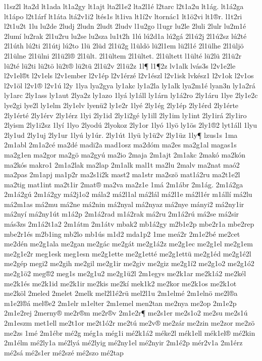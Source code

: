 {l1sz2l
lta2d
lt1ada
lt1a2gy
lt1ajt
lta2l1e2
lta2l1é
l2tarc
l2t1a2u
lt1ág.
lt1á2ga
lt1ápo
l2t1árf
lt1áta
ltá2v1i2
ltés1s
lt1iva
lt1í2v
ltornác1
lt1ö2vi
lt1®r.
l1t2ri
l2t1u2t
1lu
lu2de
2ludj
2ludn
2ludt
2ludv
l1u2go
l1ugr
lu2le
2luli
2lulr
lu2m1é
2lumí
lu2rak
2l1u2ru
lu2se
lu2sza
lu1t2h
1lú
lú2d1a
lú2gá
2l1ú2j
2l1ú2sz
lú2té
2l1úth
lú2ti
2l1útj
lú2to
1lü
2lüd
2l1ü2g
l1üldö
lü2l1em
lü2l1é
2l1ülhe
2l1üljö
2l1ülne
2l1ülni
2l1ü2l®
2l1ült.
2l1ültem
2l1ültet.
2l1ültett
l1ülté
lü2lü
2l1ü2r
lü2té
lü2ti
lü2tö
lü2t®
lü2tü
2l1ü2v
2l1ü2z
1l¶
l1¶2z
lv1alk
lvás3s
l2v1e2le
l2v1el®t
l2v1els
l2v1ember
l2v1ép
l2v1érzé
l2v1észl
l2v1isk
lvkész1
l2v1ok
l2v1os
l2v1öl
l2v1®
l2v1ú
l2y
1lya
lya2gya
ly1akc
ly1a2la
ly1alk
lya2m1é
lyan3n
ly1a2rá
ly1arc
2ly1ass
ly1aut
2lya2z
ly1azo
1lyá
ly1áll
ly1árn
ly1á2ro
2ly1áru
1lye
2ly1e2c
lye2gi
lye2l
ly1elm
2ly1elv
lyenü2
ly1e2r
1lyé
2ly1ég
2ly1ép
2ly1érd
2ly1érte
2ly1érté
2ly1érv
2ly1érz
1lyi
2ly1id
2ly1i2gé
ly1ill
2ly1im
ly1int
2ly1irá
2ly1iro
2lyism
2ly1i2sz
1lyí
1lyo
2lyodú
2lyokoz
2ly1or
1lyó
1lyö
ly1ös
2ly1®2
lyt1áll
1lyu
2ly1ud
2ly1uj
2ly1ur
1lyú
ly1úr.
2ly1út
1lyü
ly1ü2v
2ly1üz
1ly¶
lzus1s
1ma
2m1abl
2m1a2cé
ma2dé
madi2a
mad1osz
ma2dóm
ma2es
ma2g1al
magas1s
ma2g1en
ma2gor
ma2gö
ma2gyú
ma2io
2maja
2m1ajt
2m1akc
2makó
ma2kón
ma2kós
makro1
2m1a2lak
ma2lap
2m1alk
mal1t
ma2lu
2malv
ma2nat
maó2
ma2pas
2m1apj
ma1p2r
ma2s1i2k
mast2
ma1str
ma2szö
mat1á2ru
ma2t1e2l
ma2tig
mat1int
ma2t1ir
2mat®
ma2va
ma2z1e
1má
2m1ábr
2m1ág.
2m1á2ga
2m1á2gú
2m1á2gy
má2j1o2
mála2
má2l1al
má2lál
má2l1e
má2l1ér
m1állí
má2lu
má2m1as
má2mu
má2ne
má2nin
má2nyal
má2nyaz
má2nye
mányi2
má2ny1ir
má2nyí
má2ny1út
m1á2p
2m1á2rad
m1á2rak
má2ru
2m1á2rú
má2se
má2sir
más3zs
2m1á2t1a2
2m1átm
2m1átv
mbak2
mb1á2gy
m2b1e2p
mbe2r1a
mbe2rep
mbe2r1és
m2b1ing
mb2lo
mb1ús
m1d2
mda1p2
1me
meá2r
2m1e2bé
me2cet
me2dén
me2g1ala
me2gan
me2gác
me2gát
me2g1á2z
me2g1ec
me2g1el
me2g1em
me2g1e2r
meg1esk
meg1esn
me2g1ette
me2g1etté
me2g1ettü
me2g1éd
me2g1é2l
me2gép
megi2
me2gih
me2gil
me2g1ir
me2giv
me2giz
me2g1í2
me2g1o2
me2g1ó2
me2g1ö2
meg®2
meg1s
me2g1u2
me2g1ü2l
2m1egys
me2k1ar
me2k1á2
me2kél
me2k1és
me2k1id
me2k1ir
me2kis
me2kí
mek1k2
me2kor
me2k1os
me2k1ot
me2köl
2meled
2melet
2melk
mel2l1é2rü
mel2l1u
2m1elmé
2m1elnö
me2l®a
m1e2l®á
mel®e2
2m1elr
m1elter
2m1emel
men2tan
me2nya
me2op
2m1e2p
2m1e2rej
2merny®
me2r®m
me2r®v
2m1e2r¶
me2s1er
me2s1o2
me2su
me2s1ú
2m1eszm
met1ell
me2t1or
me2t1ó2r
me2tú
me2v®
me2zár
me2zin
me2zor
me2zö
me2zs
1mé
2m1ébr
mé2g
még1a
még1i
mé2k1á2
méke2l
mék1ell
mék1el®
mé2kin
2m1élm
mé2ly1a
mé2lyá
mé2lyig
mé2ny1el
mé2nyir
2m1é2p
mér2v1a
2m1érz
mé2sá
mé2s1er
mé2szé
mé2szo
mé2tap
}
